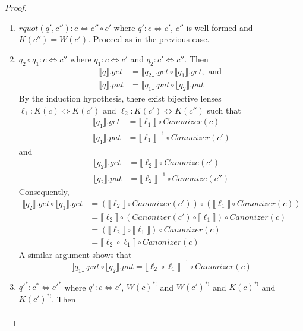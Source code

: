 \documentclass{svproc}
\begin{document}
\begin{proof}
\begin{enumerate}
  \item
  $rquot(q', c''):c \Leftrightarrow c'' \circ c'$ where $q' : c \Leftrightarrow
  c'$, $c''$ is well formed and $K(c'') = W(c')$. Proceed as in the previous
  case.
\item
$q_2 \circ q_1: c \Leftrightarrow c''$ where $q_1 : c \Leftrightarrow c'$ and
$q_2 : c' \Leftrightarrow c''$. Then
  \begin{align*}
  \llbracket q \rrbracket.get &= \llbracket q_2 \rrbracket.get\circ \llbracket
  q_1 \rrbracket.get, \text{ and }\\
  \llbracket q \rrbracket.put &= \llbracket q_1 \rrbracket.put \circ \llbracket
  q_2 \rrbracket.put
  \end{align*}
  By the induction hypothesis, there exist bijective lenses
  $\ell_1 :
  K(c) \Leftrightarrow K(c')$ and $\ell_2 : K(c') \Leftrightarrow K(c'')$ such
  that
  \begin{align*}
\llbracket q_1 \rrbracket.get &= \llbracket \ell_1 \rrbracket \circ
Canonizer(c)\\
\llbracket q_1 \rrbracket.put &= {\llbracket \ell_1 \rrbracket}^{-1} \circ
Canonizer(c')
\end{align*}
and
\begin{align*}
\llbracket q_2 \rrbracket.get &= \llbracket \ell_2 \rrbracket \circ
Canonize(c')\\
\llbracket q_2 \rrbracket.put &= {\llbracket \ell_2 \rrbracket}^{-1} \circ
Canonize(c'')
\end{align*}
Consequently,
\begin{align*}
\llbracket q_2 \rrbracket.get \circ \llbracket q_1 \rrbracket.get &=
(\llbracket \ell_2 \rrbracket \circ Canonizer(c')) \circ (\llbracket \ell_1
\rrbracket \circ Canonizer(c))\\
&= \llbracket \ell_2 \rrbracket \circ (Canonizer(c') \circ \llbracket \ell_1
\rrbracket) \circ Canonizer(c)\\
&= (\llbracket \ell_2 \rrbracket \circ \llbracket \ell_1 \rrbracket) \circ
Canonizer(c)\\
&= \llbracket \ell_2  \circ  \ell_1 \rrbracket \circ
Canonizer(c)
\end{align*} 
A similar argument shows that 
$$\llbracket q_1 \rrbracket.put \circ \llbracket q_2 \rrbracket.put =
\llbracket \ell_2  \circ  \ell_1 \rrbracket^{-1} \circ
Canonizer(c)$$
\item  
${q'}^* : c^* \Leftrightarrow {c'}^*$ where $q' : c \Leftrightarrow c'$,
$W(c)^{*!}$ and $W(c')^{*!}$ and $K(c)^{*!}$ and $K(c')^{*!}$. Then
  \begin{align*}

\end{align*}
\end{enumerate}
\end{proof}
\end{document}
